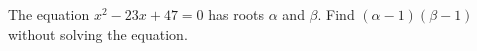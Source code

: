 The equation $x^2-23x+47=0$ has roots $\alpha$ and $\beta$. Find $(\alpha-1)(\beta-1)$ without solving the equation.
